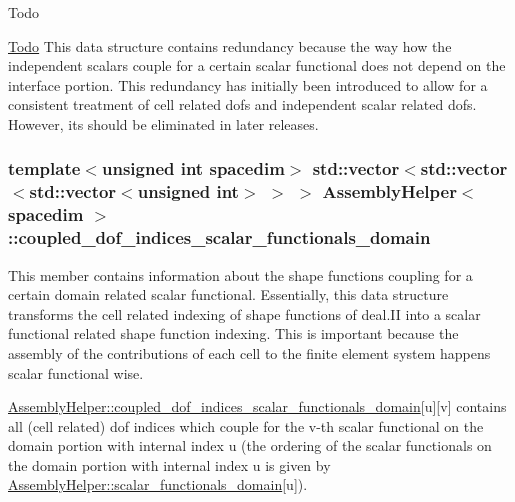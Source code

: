 \begin{DoxyRefDesc}{Todo}
\item[\hyperlink{todo__todo000004}{Todo}]This data structure contains redundancy because the way how the independent scalars couple for a certain scalar functional does not depend on the interface portion. This redundancy has initially been introduced to allow for a consistent treatment of cell related dofs and independent scalar related dofs. However, its should be eliminated in later releases. \end{DoxyRefDesc}
\subsubsection[{\texorpdfstring{coupled\+\_\+dof\+\_\+indices\+\_\+scalar\+\_\+functionals\+\_\+domain}{coupled_dof_indices_scalar_functionals_domain}}]{\setlength{\rightskip}{0pt plus 5cm}template$<$unsigned int spacedim$>$ std\+::vector$<$std\+::vector$<$std\+::vector$<$unsigned int$>$ $>$ $>$ {\bf Assembly\+Helper}$<$ spacedim $>$\+::coupled\+\_\+dof\+\_\+indices\+\_\+scalar\+\_\+functionals\+\_\+domain\hspace{0.3cm}{\ttfamily [private]}}\hypertarget{class_assembly_helper_a1a26b40224e3f04e5168accc91486493}{}\label{class_assembly_helper_a1a26b40224e3f04e5168accc91486493}
This member contains information about the shape functions coupling for a certain domain related scalar functional. Essentially, this data structure transforms the cell related indexing of shape functions of deal.\+II into a scalar functional related shape function indexing. This is important because the assembly of the contributions of each cell to the finite element system happens scalar functional wise.

\hyperlink{class_assembly_helper_a1a26b40224e3f04e5168accc91486493}{Assembly\+Helper\+::coupled\+\_\+dof\+\_\+indices\+\_\+scalar\+\_\+functionals\+\_\+domain}\mbox{[}{\ttfamily u}\mbox{]}\mbox{[}{\ttfamily v}\mbox{]} contains all (cell related) dof indices which couple for the {\ttfamily v-\/th} scalar functional on the domain portion with internal index {\ttfamily u} (the ordering of the scalar functionals on the domain portion with internal index {\ttfamily u} is given by \hyperlink{class_assembly_helper_aa6fa619e4c2582e95950e878cd06628e}{Assembly\+Helper\+::scalar\+\_\+functionals\+\_\+domain}\mbox{[}{\ttfamily u}\mbox{]}).

